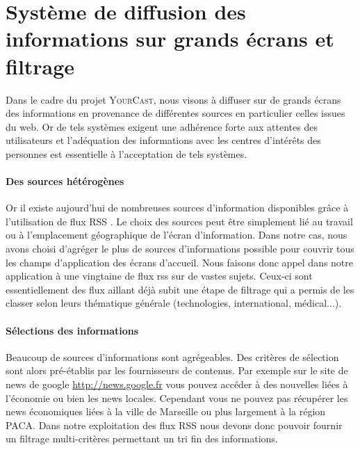 \documentclass[]{easychair}
\newcommand{\comment}[4]{\par\noindent\hspace*{-0.5cm}{\parbox{\columnwidth}{\textbf{\color{#1}//#2[#3]:#4}}}\par}
\newcommand{\mi}[1]{\comment{blue}{}{#1}{MI}}
\newcommand{\Y}[0]{\textsc{YourCast}\xspace}
\begin{document}

\section{Système de diffusion des informations sur grands écrans et filtrage}
\label{sect:exemple}
\mi{Clairement je cherche le titre...}
Dans le cadre du projet \Y, nous visons à diffuser sur de grands écrans des informations en provenance de différentes sources en particulier celles issues du web. Or de tels systèmes exigent une adhérence forte aux attentes des utilisateurs et l'adéquation des informations avec les centres d'intérêts des personnes est essentielle à l'acceptation de tels systèmes. 

\paragraph*{Des sources hétérogènes}
Or il existe aujourd'hui de nombreuses sources d'information disponibles grâce à l'utilisation de flux RSS \cite{Lassila}. Le choix des sources peut être simplement lié au travail ou à l'emplacement géographique de l'écran d'information.
Dans notre cas, nous avons choisi d'agréger le plus de sources d'informations possible pour couvrir tous les champs d'application des écrans d'accueil. 
Nous faisons donc appel dans notre application à une vingtaine de flux rss sur de vastes sujets. Ceux-ci sont essentiellement des flux aillant déjà subit une étape de filtrage qui a permis de les classer selon leurs thématique générale (technologies, international, médical...).

\paragraph*{Sélections des informations}
Beaucoup de sources d'informations sont agrégeables. Des critères de sélection sont alors pré-établis par les fournisseurs de contenus.  Par exemple sur le site de news de google \url{http://news.google.fr} vous pouvez accéder à des nouvelles liées à l'économie ou bien les news locales. Cependant  vous ne pouvez pas récupérer les news économiques liées à la ville de Marseille ou plus largement à la région PACA. Dans notre exploitation des flux RSS nous devons donc pouvoir fournir un filtrage multi-critères permettant un tri fin des informations. 
\end{document}
